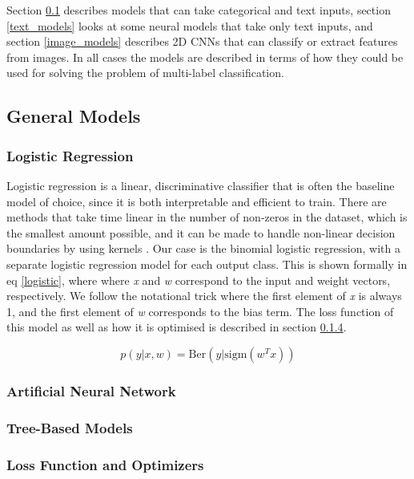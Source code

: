 Section \ref{general_models} describes models that can take categorical and text inputs, section \ref{text_models} looks at some neural models that take only text inputs, and section \ref{image_models} describes 2D CNNs that can classify or extract features from images.
In all cases the models are described in terms of how they could be used for solving the problem of multi-label classification.

\subsection{General Models}
\label{general_models}



\subsubsection{Logistic Regression}

Logistic regression is a linear, discriminative classifier that is often the baseline model of choice, since it is both interpretable and efficient to train.
There are methods that take time linear in the number of non-zeros in the dataset, which is the smallest amount possible, and it can be made to handle non-linear decision boundaries by using kernels \cite{murphy}.
Our case is the binomial logistic regression, with a separate logistic regression model for each output class.
This is shown formally in eq  \ref{logistic}, where where \textit{x} and \textit{w} correspond to the input and weight vectors, respectively.
We follow the notational trick where the first element of \textit{x} is always 1, and the first element of \textit{w} corresponds to the bias term.
The loss function of this model as well as how it is optimised is described in section \ref{loss}.

\begin{equation}
\label{logistic}
p(y|x,w)=\mathrm{Ber}(y|\mathrm{sigm}(w^Tx))
\end{equation}



\subsubsection{Artificial Neural Network}
\subsubsection{Tree-Based Models}

\subsubsection{Loss Function and Optimizers}
\label{loss}

